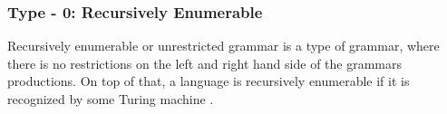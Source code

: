 \subsubsection{Type - 0: Recursively Enumerable}
Recursively enumerable or unrestricted grammar is a type of grammar, where there is no restrictions on the left and right hand side of the grammars productions. On top of that, a language is recursively enumerable if it is recognized by some Turing machine \citep{sipser}.  %

